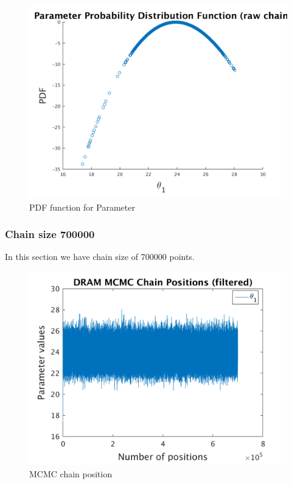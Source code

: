 \begin{figure}[H]
  
  \centering
   \includegraphics[scale=0.75]{100_results/outputData_300000/ip_logLike_unified}
   \caption{PDF function for Parameter }
\end{figure}


%
\subsubsection{Chain size 700000 }


In this section we have chain size of 700000 points. 

\begin{figure}[H]
  
  \centering
   \includegraphics[scale=0.75]{100_results/outputData_700000/simple_ip_chain_pos_filt}
   \caption{MCMC chain position }
\end{figure}


